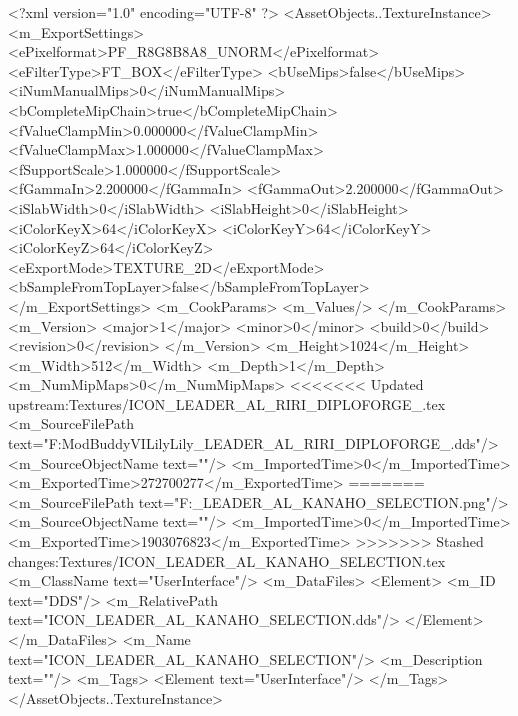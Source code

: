 <?xml version="1.0" encoding="UTF-8" ?>
<AssetObjects..TextureInstance>
	<m_ExportSettings>
		<ePixelformat>PF_R8G8B8A8_UNORM</ePixelformat>
		<eFilterType>FT_BOX</eFilterType>
		<bUseMips>false</bUseMips>
		<iNumManualMips>0</iNumManualMips>
		<bCompleteMipChain>true</bCompleteMipChain>
		<fValueClampMin>0.000000</fValueClampMin>
		<fValueClampMax>1.000000</fValueClampMax>
		<fSupportScale>1.000000</fSupportScale>
		<fGammaIn>2.200000</fGammaIn>
		<fGammaOut>2.200000</fGammaOut>
		<iSlabWidth>0</iSlabWidth>
		<iSlabHeight>0</iSlabHeight>
		<iColorKeyX>64</iColorKeyX>
		<iColorKeyY>64</iColorKeyY>
		<iColorKeyZ>64</iColorKeyZ>
		<eExportMode>TEXTURE_2D</eExportMode>
		<bSampleFromTopLayer>false</bSampleFromTopLayer>
	</m_ExportSettings>
	<m_CookParams>
		<m_Values/>
	</m_CookParams>
	<m_Version>
		<major>1</major>
		<minor>0</minor>
		<build>0</build>
		<revision>0</revision>
	</m_Version>
	<m_Height>1024</m_Height>
	<m_Width>512</m_Width>
	<m_Depth>1</m_Depth>
	<m_NumMipMaps>0</m_NumMipMaps>
<<<<<<< Updated upstream:Textures/ICON_LEADER_AL_RIRI_DIPLOFORGE_.tex
	<m_SourceFilePath text="F:\1\Firaxis ModBuddy\Civilization VI\Assault Lily\Assault Lily\Textures\ICON_LEADER_AL_RIRI_DIPLOFORGE_.dds"/>
	<m_SourceObjectName text=""/>
	<m_ImportedTime>0</m_ImportedTime>
	<m_ExportedTime>272700277</m_ExportedTime>
=======
	<m_SourceFilePath text="F:\DT\lilyimages\all\ICON_LEADER_AL_KANAHO_SELECTION.png"/>
	<m_SourceObjectName text=""/>
	<m_ImportedTime>0</m_ImportedTime>
	<m_ExportedTime>1903076823</m_ExportedTime>
>>>>>>> Stashed changes:Textures/ICON_LEADER_AL_KANAHO_SELECTION.tex
	<m_ClassName text="UserInterface"/>
	<m_DataFiles>
		<Element>
			<m_ID text="DDS"/>
			<m_RelativePath text="ICON_LEADER_AL_KANAHO_SELECTION.dds"/>
		</Element>
	</m_DataFiles>
	<m_Name text="ICON_LEADER_AL_KANAHO_SELECTION"/>
	<m_Description text=""/>
	<m_Tags>
		<Element text="UserInterface"/>
	</m_Tags>
</AssetObjects..TextureInstance>

